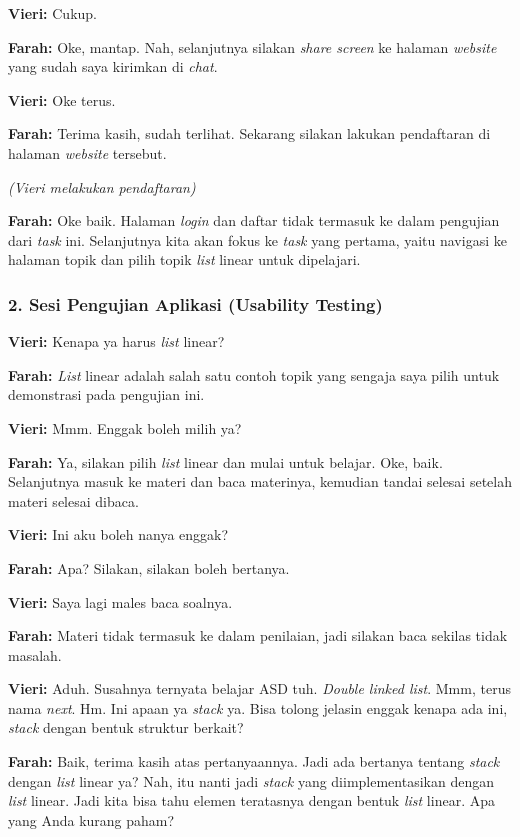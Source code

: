 \textbf{Vieri:} Cukup.

\textbf{Farah:} Oke, mantap. Nah, selanjutnya silakan \textit{share screen} ke halaman \textit{website} yang sudah saya kirimkan di \textit{chat}.

\textbf{Vieri:} Oke terus.

\textbf{Farah:} Terima kasih, sudah terlihat. Sekarang silakan lakukan pendaftaran di halaman \textit{website} tersebut.

\textit{(Vieri melakukan pendaftaran)}

\textbf{Farah:} Oke baik. Halaman \textit{login} dan daftar tidak termasuk ke dalam pengujian dari \textit{task} ini. Selanjutnya kita akan fokus ke \textit{task} yang pertama, yaitu navigasi ke halaman topik dan pilih topik \textit{list} linear untuk dipelajari.

\bigskip

\subsubsection*{2. Sesi Pengujian Aplikasi (Usability Testing)}

\textbf{Vieri:} Kenapa ya harus \textit{list} linear?

\textbf{Farah:} \textit{List} linear adalah salah satu contoh topik yang sengaja saya pilih untuk demonstrasi pada pengujian ini.

\textbf{Vieri:} Mmm. Enggak boleh milih ya?

\textbf{Farah:} Ya, silakan pilih \textit{list} linear dan mulai untuk belajar. Oke, baik. Selanjutnya masuk ke materi dan baca materinya, kemudian tandai selesai setelah materi selesai dibaca.

\textbf{Vieri:} Ini aku boleh nanya enggak?

\textbf{Farah:} Apa? Silakan, silakan boleh bertanya.

\textbf{Vieri:} Saya lagi males baca soalnya.

\textbf{Farah:} Materi tidak termasuk ke dalam penilaian, jadi silakan baca sekilas tidak masalah.

\textbf{Vieri:} Aduh. Susahnya ternyata belajar ASD tuh. \textit{Double linked list}. Mmm, terus nama \textit{next}. Hm. Ini apaan ya \textit{stack} ya. Bisa tolong jelasin enggak kenapa ada ini, \textit{stack} dengan bentuk struktur berkait?

\textbf{Farah:} Baik, terima kasih atas pertanyaannya. Jadi ada bertanya tentang \textit{stack} dengan \textit{list} linear ya? Nah, itu nanti jadi \textit{stack} yang diimplementasikan dengan \textit{list} linear. Jadi kita bisa tahu elemen teratasnya dengan bentuk \textit{list} linear. Apa yang Anda kurang paham?

